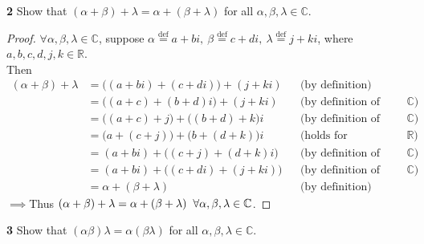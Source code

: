 \documentclass{article}
\begin{document}
\noindent \textbf{2} \hspace{3 mm} Show that $(\alpha + \beta) + \lambda = \alpha + (\beta + \lambda)$ for all $\alpha, \beta, \lambda \in \mathbb{C}$. \color{red}

\begin{proof}
    $\forall \alpha, \beta, \lambda \in \mathbb{C}$, suppose $\alpha \stackrel{\text{def}}{=} a + bi, \  \beta \stackrel{\text{def}}{=} c + di, \ \lambda \stackrel{\text{def}}{=} j + ki$, where $a, b, c, d, j, k \in \mathbb{R}$.\\
    \indent Then
    \begin{align*}
        (\alpha + \beta) + \lambda &= \Big((a + bi) + (c + di)\Big) + (j + ki) &&\text{(by definition)}\\
        &= \Big((a + c) + (b + d)i\Big) + (j + ki) &&\text{(by definition of addition over $\mathbb{C}$)}\\
        &= \Big((a + c) + j\Big) + \Big((b + d) + k\Big)i &&\text{(by definition of addition over $\mathbb{C}$)}\\
        &= \Big(a + (c + j)\Big) + \Big(b + (d + k)\Big)i &&\text{(holds for associativity over $\mathbb{R}$)}\\
        &= (a + bi) + \Big((c + j) + (d + k)i\Big) &&\text{(by definition of addition over $\mathbb{C}$)}\\
        &= (a + bi) + \Big((c + di) + (j + ki)\Big) &&\text{(by definition of addition over $\mathbb{C}$)}\\
        &= \alpha + (\beta + \lambda) &&\text{(by definition)}
    \end{align*}
    $\implies$Thus $(\alpha + \beta) + \lambda = \alpha + (\beta + \lambda) \hspace{2 mm} \forall \alpha, \beta, \lambda \in \mathbb{C}$.
\end{proof}
\color{black}
\pagebreak

\noindent \textbf{3} \hspace{3 mm} Show that $(\alpha\beta)\lambda = \alpha(\beta\lambda)$ for all $\alpha, \beta, \lambda \in \mathbb{C}$. \color{red}
\end{document}
